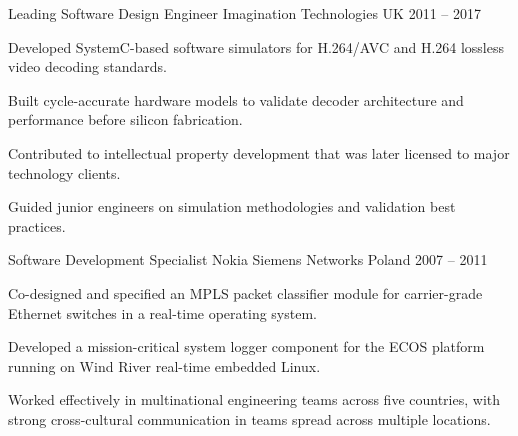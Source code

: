 \begin{cventries}
  \cventry
    {Leading Software Design Engineer} %
    {Imagination Technologies} %
    {UK} %
    {2011 -- 2017} %
    {
      \begin{cvitems}
        \item {Developed SystemC-based software simulators for H.264/AVC and H.264 lossless video decoding standards.}
        \item {Built cycle-accurate hardware models to validate decoder architecture and performance before silicon fabrication.}
        \item {Contributed to intellectual property development that was later licensed to major technology clients.}
        \item {Guided junior engineers on simulation methodologies and validation best practices.}
      \end{cvitems}
    }

  \cventry
    {Software Development Specialist} %
    {Nokia Siemens Networks} %
    {Poland} %
    {2007 -- 2011} %
    {
      \begin{cvitems}
        \item {Co-designed and specified an MPLS packet classifier module for carrier-grade Ethernet switches in a real-time operating system.}
        \item {Developed a mission-critical system logger component for the ECOS platform running on Wind River real-time embedded Linux.}
        \item {Worked effectively in multinational engineering teams across five countries, with strong cross-cultural communication in teams spread across multiple locations.}
      \end{cvitems}
    }

\end{cventries}
